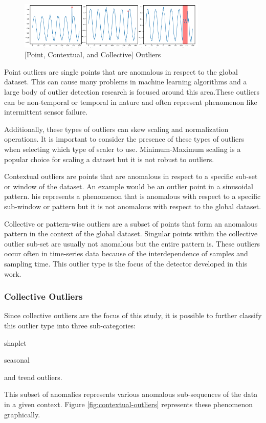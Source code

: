 \begin{figure}[H]
    \includegraphics[width=0.8\textwidth]{Images/outliers_graphic.PNG}
    \caption{[Point, Contextual, and Collective] Outliers \parencite{lai2021revisiting}}
    \label{fig:outliers-graphic}
\end{figure}

Point outliers are single points that are anomalous in respect to the global dataset. This can cause many problems in machine learning algorithms and a large body of outlier detection research is focused around this area.These outliers can be non-temporal or temporal in nature and often represent phenomenon like intermittent sensor failure. 

Additionally, these types of outliers can skew scaling and normalization operations. It is important to consider the presence of these types of outliers when selecting which type of scaler to use. Minimum-Maximum scaling is a popular choice for scaling a dataset but it is not robust to outliers. 

Contextual outliers are points that are anomalous in respect to a specific sub-set or window of the dataset. An example would be an outlier point in a sinusoidal pattern. his represents a phenomenon that is anomalous with respect to a specific sub-window or pattern but it is not anomalous with respect to the global dataset. 

Collective or pattern-wise outliers are a subset of points that form an anomalous pattern in the context of the global dataset. Singular points within the collective outlier sub-set are usually not anomalous but the entire pattern is. These outliers occur often in time-series data because of the interdependence of samples and sampling time. This outlier type is the focus of the detector developed in this work.

\subsubsection{Collective Outliers}

Since collective outliers are the focus of this study, it is possible to further classify this outlier type into three sub-categories:
\begin{inlinelist}
    \item shaplet
    \item seasonal
    \item and trend outliers.
\end{inlinelist}
This subset of anomalies represents various anomalous sub-sequences of the data in a given context. Figure \ref{fig:contextual-outliers} represents these phenomenon graphically. 

